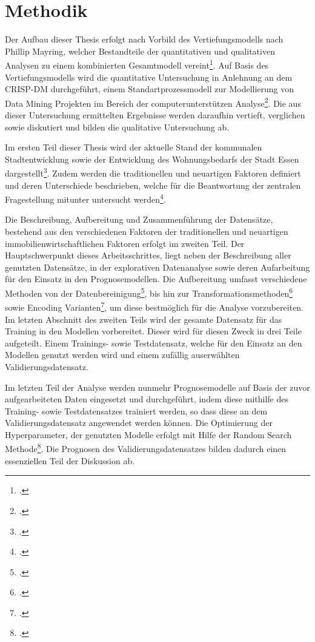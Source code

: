 \section{Methodik}
Der Aufbau dieser Thesis erfolgt nach Vorbild des Vertiefungsmodells 
nach Phillip Mayring, welcher Bestandteile der quantitativen und 
qualitativen Analysen zu einem kombinierten Gesamtmodell vereint\footcite[Vgl. ][]{Mayring2001}.  
Auf Basis des Vertiefungsmodells wird die quantitative Untersuchung 
in Anlehnung an dem CRISP-DM durchgeführt, einem Standartprozessmodell 
zur Modellierung von Data Mining Projekten im Bereich der 
computerunterstützen Analyse\footcite[Vgl. ][]{Wirth2000}. Die aus dieser Untersuchung 
ermittelten Ergebnisse werden daraufhin vertieft, verglichen sowie diskutiert und 
bilden die qualitative Untersuchung ab.

Im ersten Teil dieser Thesis wird der aktuelle Stand der kommunalen Stadtentwicklung 
sowie der Entwicklung des Wohnungsbedarfs der Stadt Essen dargestellt\footcite[Vgl. ][]{StadtEssen2018}. 
Zudem werden die traditionellen und neuartigen Faktoren definiert und deren Unterschiede 
beschrieben, welche für die Beantwortung der zentralen Fragestellung mitunter 
untersucht werden\footcite[Vgl. ][]{Asaftei2018}.

Die Beschreibung, Aufbereitung und Zusammenführung der Datensätze, bestehend aus den 
verschiedenen Faktoren der traditionellen und neuartigen immobilienwirtschaftlichen 
Faktoren erfolgt im zweiten Teil. Der Hauptschwerpunkt dieses Arbeitsschrittes, liegt 
neben der Beschreibung aller genutzten Datensätze, in der explorativen Datenanalyse sowie 
deren Aufarbeitung für den Einsatz in den Prognosemodellen. Die Aufbereitung umfasst 
verschiedene Methoden von der Datenbereinigung\footcite[Vgl. ][]{Rahm2000}, bis hin zur 
Transformationsmethoden\footcite[Vgl. ][]{Box1964} sowie Encoding Varianten\footcite[Vgl. ][]{Cerda2018}, 
um diese bestmöglich für die Analyse vorzubereiten. Im letzten Abschnitt des zweiten 
Teils wird der gesamte Datensatz für das Training in den Modellen 
vorbereitet. Dieser wird für diesen Zweck in drei Teile aufgeteilt. Einem Trainings- 
sowie Testdatensatz, welche für den Einsatz an den Modellen genutzt werden wird und 
einem zufällig auserwählten Validierungsdatensatz.

Im letzten Teil der Analyse werden nunmehr Prognosemodelle auf Basis der zuvor 
aufgearbeiteten Daten eingesetzt und durchgeführt, indem diese mithilfe des Training- sowie Testdatensatzes 
trainiert werden, so dass diese an dem Validierungsdatensatz angewendet werden können.
Die Optimierung der Hyperparameter, der genutzten Modelle erfolgt mit Hilfe der Random 
Search Methode\footcite[Vgl. ][]{Bergstra2012}. Die Prognosen des Validierungsdatensatzes 
bilden dadurch einen essenziellen Teil der Diskussion ab. 

